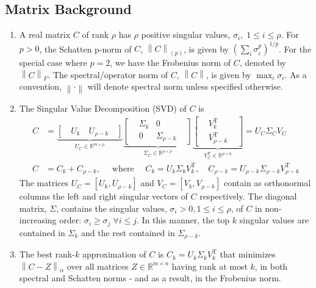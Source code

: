 \documentclass[11pt]{article}
\def\reals{\mathbb{R}}
\newcommand{\norm}[1]{\left\|#1\right\|}
\newcommand{\0}{\ensuremath{\mathbf{0}}}
\renewcommand{\>}{\succ}
\newcommand{\<}{\prec}
\begin{document}
\subsection{Matrix Background}
\begin{enumerate}
\item A real matrix $C$ of rank $\rho$ has $\rho$ positive singular values, $\sigma_i, \; 1 \leq i \leq \rho$. For $p > 0$, the Schatten p-norm of $C$, $\norm{C}_{(p)}$, is given by $\left( \sum_i \sigma_i ^p \right)^{1/p}$. For the special case where $p=2$, we have the Frobenius norm of $C$, denoted by $\norm{C}_F$. The spectral/operator norm of $C$, $\norm{C}$, is given by $\displaystyle \max_i \sigma_i$. As a convention, $\norm{ \cdot }$ will denote spectral norm unless specified otherwise. 

\item The Singular Value Decomposition (SVD) of $C$ is
\begin{align*}
C &= \underbrace{[ \quad U_k \quad U_{\rho - k} \quad ]}_\text{$U_C \in \reals^{m \times \rho}$}
\underbrace{\begin{bmatrix}
&\Sigma_k & 0 &\\
&0 & \Sigma_{\rho - k}&
\end{bmatrix}}_\text{$\Sigma_C \in \reals^{\rho \times \rho}$}
\underbrace{\begin{bmatrix}
&V_k^{\text{T}}&\\
&V_{\rho - k}^{\text{T}}&
\end{bmatrix}}_\text{$V_C^{\text{T}} \in \reals^{\rho \times n}$} = U_C\Sigma_C V_C\\
C & = C_k + C_{\rho - k}, \quad \text{ where } \quad C_k  = U_k\Sigma_kV_k^{\text{T}}, \quad  C_{\rho - k}  = U_{\rho - k}\Sigma_{\rho - k}V_{\rho -k}^{\text{T}}
\end{align*} 
The matrices $U_C = [U_k, U_{\rho - k}]$ and $V_C = [V_k, V_{\rho - k}]$ contain as orthonormal columns the left and right singular vectors of $C$ respectively. The diagonal matrix, $\Sigma$, contains the singular values, $\sigma_i > 0, 1 \leq i \leq \rho$, of $C$ in non-increasing order: $\sigma_{i} \geq \sigma_{j}\; \forall i \leq j$. In this manner, the top $k$ singular values are contained in $\Sigma_k$ and the rest contained in $\Sigma_{\rho - k}$. 

\item The best rank-$k$ approximation of $C$ is $C_k = U_k\Sigma_kV_k^{\text{T}}$ that minimizes $\norm{C - Z}_{\alpha}$ over all matrices $Z \in \reals^{m \times n}$ having rank at most $k$, in both spectral and Schatten norms - and as a result, in the Frobenius norm. 


\end{enumerate}
\end{document}
